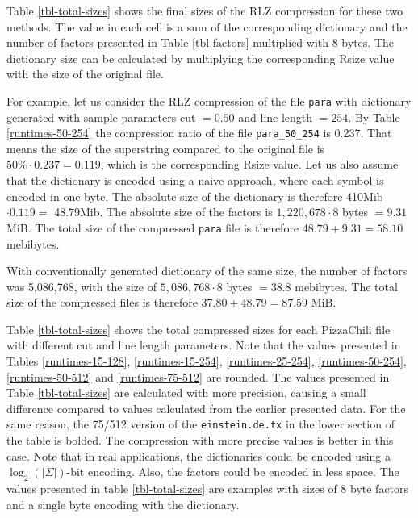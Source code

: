 \documentclass[english,twoside,censored,csm,algorithms-track-2020]{HYthesisML}
\theoremstyle{plain}
\theoremstyle{definition}
\begin{document}
\vspace{-1cm}
Table \ref{tbl-total-sizes} shows
the final sizes of the RLZ compression for these two methods. The value in each cell is a sum of
the corresponding dictionary and the number of factors presented in Table \ref{tbl-factors} multiplied
with 8 bytes. The dictionary size can be calculated by multiplying the corresponding Rsize value with
the size of the original file.

For example, let us consider the RLZ compression of the file \texttt{para} with dictionary
generated with sample
parameters cut $= 0.50$ and line length $= 254$.
By Table \ref{runtimes-50-254} the compression ratio of the
file \texttt{para\_50\_254} is 0.237. That means the size of the superstring compared to the
original file is $50\% \cdot 0.237 = 0.119$, which is the corresponding Rsize value.
Let us also assume that the dictionary is encoded using a naive approach, where each symbol is
encoded in one byte.
The absolute
size of the dictionary is therefore 410Mib $\cdot 0.119 = $ 48.79Mib. The absolute size of the
factors is $1,220,678\cdot 8$ bytes $= 9.31$ MiB. The total size of the compressed \texttt{para}
file is therefore $48.79 + 9.31 = 58.10$ mebibytes.

With conventionally generated dictionary of the same size, the number of factors was 5,086,768,
with the size of $5,086,768\cdot 8$ bytes $= 38.8$ mebibytes. The total size of the compressed
files is therefore $37.80 + 48.79 = 87.59$ MiB.

Table \ref{tbl-total-sizes} shows the total compressed sizes for each PizzaChili file with different
cut and line length parameters. Note that the values presented in Tables \ref{runtimes-15-128},
\ref{runtimes-15-254}, \ref{runtimes-25-254}, \ref{runtimes-50-254}, \ref{runtimes-50-512} and
\ref{runtimes-75-512} are rounded. The values presented in Table \ref{tbl-total-sizes} are
calculated with more precision, causing a small difference compared to values calculated from the
earlier presented data. For the same reason, the 75/512 version of the \texttt{einstein.de.tx}
in the lower section of the table is bolded. The compression with more precise values is better
in this case. Note that in real applications, the dictionaries could be encoded using a
$\log_2(|\Sigma|)$-bit encoding. Also, the factors could be encoded in less space. The values
presented in table \ref{tbl-total-sizes} are examples with sizes of 8 byte factors and a single
byte encoding with the dictionary.
\end{document}
